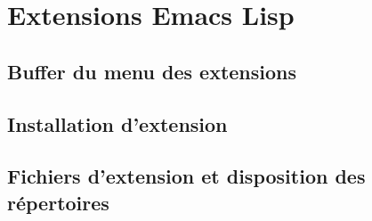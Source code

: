 \chapter{Extensions Emacs Lisp}\label{chap32}
\section{Buffer du menu des extensions}\label{chap32sec1}
\section{Installation d'extension}\label{chap32sec2}
\section{Fichiers d'extension et disposition des
  répertoires}\label{chap32sec3} 
